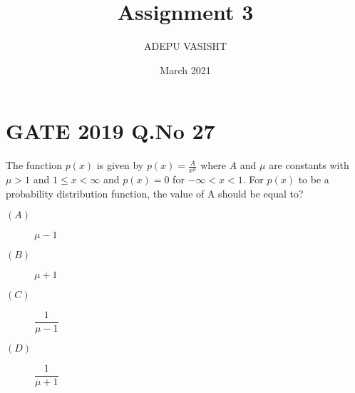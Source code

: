 \documentclass[journal,12pt,twocolumn]{IEEEtran}
\title{Assignment 3}
\author{ADEPU VASISHT}
\date{March 2021}
\providecommand{\brak}[1]{\ensuremath{\left(#1\right)}}
\begin{document}
\maketitle

\section*{GATE 2019 Q.No 27}
The function $p\brak{x}$ is given by $p\brak{x} = \frac{A}{x^\mu}$ where $A$ and $\mu$ are constants with $\mu>1$ and $1\leq x<\infty$ and $p\brak{x}= 0$ for $-\infty<x<1$. For $p\brak{x}$ to be a probability distribution function, the value of A should be equal to?

\begin{description}
\item[$\brak{A}$]$\mu -1$\\
\item[$\brak{B}$]$\mu+1$\\
\item[$\brak{C}$]$\dfrac{1}{\mu-1}$\\
\item[$\brak{D}$]$\dfrac{1}{\mu+1}$\\
\end{description}
\end{document}
